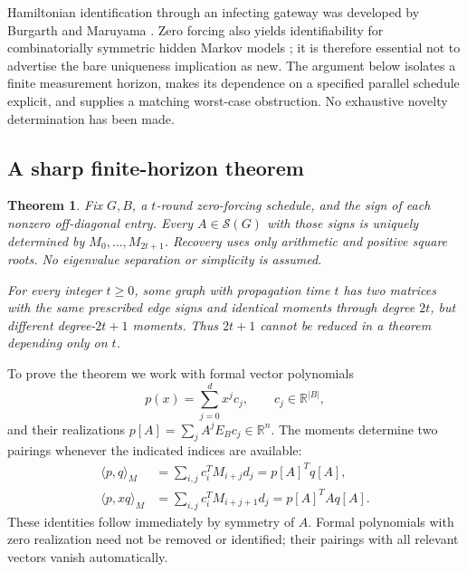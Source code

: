 \documentclass[11pt,a4paper]{article}
\newtheorem{theorem}{Theorem}[section]
\theoremstyle{definition}\newtheorem{definition}[theorem]{Definition}
\theoremstyle{remark}\newtheorem{remark}[theorem]{Remark}
\newcommand{\R}{\mathbb R}\newcommand{\C}{\mathbb C}\newcommand{\N}{\mathbb N}
\numberwithin{equation}{section}
\begin{document}
Hamiltonian identification through an infecting gateway was developed by Burgarth and Maruyama \cite{ref001}. Zero forcing also yields identifiability for combinatorially symmetric hidden Markov models \cite{ref002}; it is therefore essential not to advertise the bare uniqueness implication as new. The argument below isolates a finite measurement horizon, makes its dependence on a specified parallel schedule explicit, and supplies a matching worst-case obstruction. No exhaustive novelty determination has been made.

\subsection{A sharp finite-horizon theorem}\label{S01-sec-2}
\begin{theorem}\label{S01-thm:main}
Fix $G,B$, a $t$-round zero-forcing schedule, and the sign of each nonzero off-diagonal entry. Every $A\in\mathcal S(G)$ with those signs is uniquely determined by $M_0,\ldots,M_{2t+1}$. Recovery uses only arithmetic and positive square roots. No eigenvalue separation or simplicity is assumed.

For every integer $t\ge0$, some graph with propagation time $t$ has two matrices with the same prescribed edge signs and identical moments through degree $2t$, but different degree-$2t+1$ moments. Thus $2t+1$ cannot be reduced in a theorem depending only on $t$.
\end{theorem}

To prove the theorem we work with formal vector polynomials
\[
 p(x)=\sum_{j=0}^d x^j c_j,\qquad c_j\in\R^{|B|},
\]
and their realizations $p[A]=\sum_j A^jE_Bc_j\in\R^n$. The moments determine two pairings whenever the indicated indices are available:
\begin{align}
 \langle p,q\rangle_M&=\sum_{i,j}c_i^TM_{i+j}d_j=p[A]^Tq[A],\label{S01-eq:gram}\\
 \langle p,xq\rangle_M&=\sum_{i,j}c_i^TM_{i+j+1}d_j=p[A]^TAq[A].\label{S01-eq:shift}
\end{align}
These identities follow immediately by symmetry of $A$. Formal polynomials with zero realization need not be removed or identified; their pairings with all relevant vectors vanish automatically.
\end{document}
